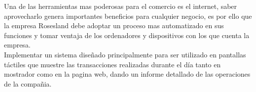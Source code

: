 Una de las herramientas mas poderosas para el comercio es el internet, 
saber aprovecharlo genera importantes beneficios para cualquier negocio, 
es por ello que la empresa Rosesland debe adoptar un proceso mas automatizado
en sus funciones y tomar ventaja de los ordenadores y dispositivos con los que cuenta la empresa. \\[0.3cm]
Implementar un sistema diseñado principalmente para ser utilizado en pantallas táctiles
que muestre las transacciones realizadas durante el día tanto en mostrador como en la pagina web,
dando un informe detallado de las operaciones de la compañia.